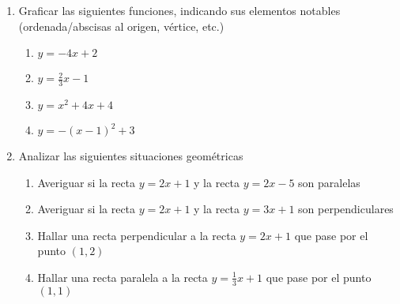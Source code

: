 \documentclass[a4paper]{article}
\newcommand{\answer}{\item[**]}
\newcommand{\exercise}{\item}
\begin{document}
\begin{enumerate}
\begin{multicols}{2}
\begin{enumerate} [label=(\alph*)]
		\item $\displaystyle\frac{\sqrt{3}x-3}{2}$ con $x \in \mathbb{Z}$
		\answer Pertenece a $\mathbb{R}$, por ser el cociente de un número irracional y un número entero. 

		\item $x+3$ con $x \in \mathbb{Q}$
		\answer Pertenece a $\mathbb{Q}$, por ser la suma de dos números racionales.

		\item $\displaystyle\frac{1}{x}$ con $x \in \mathbb{Q}$ y $x \neq 0$
		\answer Pertenece a $\mathbb{Q}$, por ser el cociente de dos números racionales.

		\item $\sqrt{x}$ con $x \in \mathbb{Q}$
		\answer Pertenece a $\mathbb{R}$, por ser la raíz cuadrada de un número racional.
	\end{enumerate}
	\end{multicols}

	\exercise Graficar las siguientes funciones, indicando sus elementos notables (ordenada/abscisas al origen, vértice, etc.)
	\begin{enumerate} [label=(\alph*)]
		\item $y=-4x+2$

		\item $y=\displaystyle\frac{2}{3}x-1$
		
		\item $y=x^2+4x+4$

		\item $y=-(x-1)^2+3$
	
	\end{enumerate}

	\exercise Analizar las siguientes situaciones geométricas
	\begin{enumerate} [label=(\alph*)]
		\item Averiguar si la recta $y=2x+1$ y la recta $y=2x-5$ son paralelas

		\item Averiguar si la recta $y=2x+1$ y la recta $y=3x+1$ son perpendiculares

		\item Hallar una recta perpendicular a la recta $y=2x+1$ que pase por el punto $(1,2)$

		\item Hallar una recta paralela a la recta $y=\frac{1}{3}x+1$ que pase por el punto $(1,1)$


\end{enumerate}
\end{enumerate}
\end{document}

